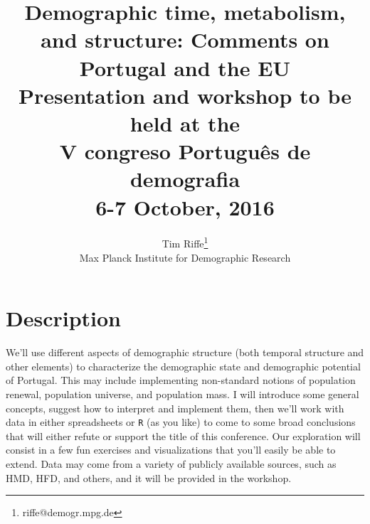 \documentclass{article}
\begin{document}
\title{Demographic time, metabolism, and structure: Comments on Portugal and the EU\\ \vspace{1em}
\small{Presentation and workshop to be held at the} \\ 
\small{V congreso Portugu\^{e}s de demografia} \\
\small{6-7 October, 2016}}
\author[1]{Tim Riffe\thanks{riffe@demogr.mpg.de} \\ Max Planck Institute for Demographic Research}


\maketitle
\onehalfspacing
\section*{Description}
We'll use different aspects of demographic structure (both temporal structure and other elements) to characterize the demographic state and demographic potential of Portugal. This may include implementing non-standard notions of population renewal, population universe, and population mass. I will introduce some general concepts, suggest how to interpret and implement them, then we'll work with data in either spreadsheets or \texttt{R} (as you like) to come to some broad conclusions that will either refute or support the title of this conference. Our exploration will consist in a few fun exercises and visualizations that you'll easily be able to extend. Data may come from a variety of publicly available sources, such as HMD, HFD, and others, and it will be provided in the workshop.


%
%
%
\end{document}
